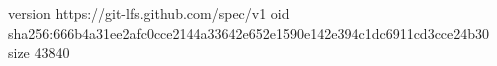 version https://git-lfs.github.com/spec/v1
oid sha256:666b4a31ee2afc0cce2144a33642e652e1590e142e394c1dc6911cd3cce24b30
size 43840
